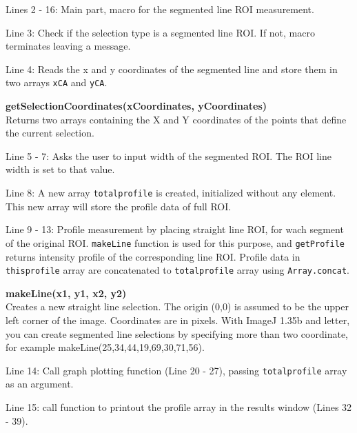 \documentclass[11pt,a4paper,oneside]{report}
\newenvironment{indentCom}%
{\begin{list}{}%
         {\setlength{\leftmargin}{1em}}%
         \item[]%
}
{\end{list}}
\newcommand{\ilcom}[1]{\texttt{\small#1}}
\begin{document}
\begin{itemize}
\item Lines 2 - 16: Main part, macro for the segmented line ROI measurement.  

\item Line 3: Check if the selection type is a segmented line ROI. If not, macro
terminates leaving a message.

\item Line 4: Reads the x and y coordinates of the segmented line
and store them in two arrays \ilcom{xCA} and \ilcom{yCA}.

\begin{indentCom}
\textbf{getSelectionCoordinates(xCoordinates, yCoordinates)}\\
Returns two arrays containing the X and Y coordinates of the points that define the current selection. 
\end{indentCom}

\item Line 5 - 7: Asks the user to input width of the segmented ROI. The ROI
line width is set to that value.

\item Line 8: A new array \ilcom{totalprofile} is created, initialized without
any element. This new array will store the profile data of full ROI.

\item Line 9 - 13: Profile measurement by placing straight line ROI,
for wach segment of the original ROI. \ilcom{makeLine} function is used for this
purpose, and \ilcom{getProfile} returns intensity profile of the corresponding
line ROI. Profile data in \ilcom{thisprofile} array are concatenated to
\ilcom{totalprofile} array using \ilcom{Array.concat}.

\begin{indentCom}
\textbf{makeLine(x1, y1, x2, y2)}\\
Creates a new straight line selection. The origin (0,0) is assumed to be the upper left corner of the image. Coordinates are in pixels. With ImageJ 1.35b and letter, you can create segmented line selections by specifying more than two coordinate, for example makeLine(25,34,44,19,69,30,71,56).
\end{indentCom}

\item Line 14: Call graph plotting function (Line 20 - 27), passing
\ilcom{totalprofile} array as an argument.

\item Line 15: call function to printout the profile array in the results window
(Lines 32 - 39).


\end{itemize}
\end{document}
